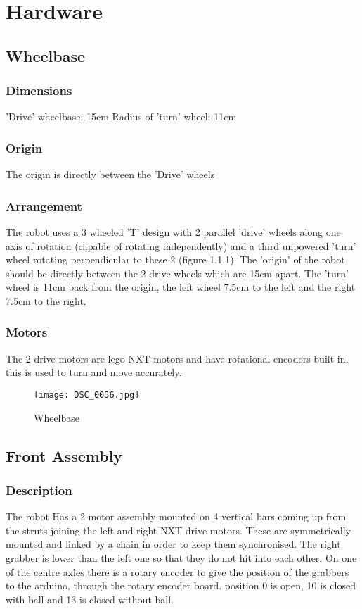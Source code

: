 \section{Hardware}
\subsection{Wheelbase}
\subsubsection{Dimensions}
'Drive' wheelbase:		15cm \newline
Radius of 'turn' wheel: 11cm
\subsubsection{Origin}
The origin is directly between the 'Drive' wheels
\subsubsection{Arrangement}
The robot uses a 3 wheeled 'T' design with 2 parallel 'drive' wheels along one axis of rotation (capable of rotating independently) and a third unpowered 'turn' wheel rotating perpendicular to these 2 (figure 1.1.1). The 'origin' of the robot should be 
directly between the 2 drive wheels which are 15cm apart. The 'turn' wheel 
is 11cm back from the origin, the left wheel 7.5cm to the left and the right
7.5cm to the right. 

\subsubsection{Motors}
The 2 drive motors are lego NXT motors and have rotational encoders built in, this is used to turn and move accurately. 


\begin{figure}[!ht]
\caption{Wheelbase}
\centering
\texttt{[image: DSC\_0036.jpg]}
\end{figure}

\subsection{Front Assembly}
\subsubsection{Description}
The robot Has a 2 motor assembly mounted on 4 vertical bars coming up from the struts joining the left and right NXT drive motors. These are symmetrically mounted and linked by a chain in order to keep them synchronised. The right grabber is lower than the left one so that they do not hit into each other. On one of the centre axles there is a rotary encoder to give the position of the grabbers to the arduino, through the rotary encoder board. position 0 is open, 10 is closed with ball and 13 is closed without ball.

